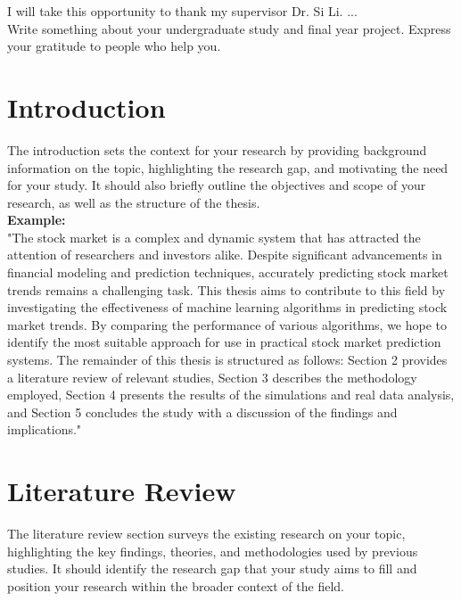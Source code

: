 \documentclass[openany]{book}
\numberwithin{figure}{chapter}
\numberwithin{equation}{chapter}
\begin{document}
I will take this opportunity to thank my supervisor Dr. Si Li. ...\\

Write something about your undergraduate study and final year project. Express your gratitude to people who help you.


\tableofcontents
\listoffigures
\listoftables
\newpage
{}



\chapter{Introduction}

The introduction sets the context for your research by providing background information on the topic, highlighting the research gap, and motivating the need for your study. It should also briefly outline the objectives and scope of your research, as well as the structure of the thesis.\\


{\bf Example:}\\

"The stock market is a complex and dynamic system that has attracted the attention of researchers and investors alike. Despite significant advancements in financial modeling and prediction techniques, accurately predicting stock market trends remains a challenging task. This thesis aims to contribute to this field by investigating the effectiveness of machine learning algorithms in predicting stock market trends. By comparing the performance of various algorithms, we hope to identify the most suitable approach for use in practical stock market prediction systems. The remainder of this thesis is structured as follows: Section 2 provides a literature review of relevant studies, Section 3 describes the methodology employed, Section 4 presents the results of the simulations and real data analysis, and Section 5 concludes the study with a discussion of the findings and implications."

\chapter{Literature Review}

The literature review section surveys the existing research on your topic, highlighting the key findings, theories, and methodologies used by previous studies. It should identify the research gap that your study aims to fill and position your research within the broader context of the field.
\end{document}
